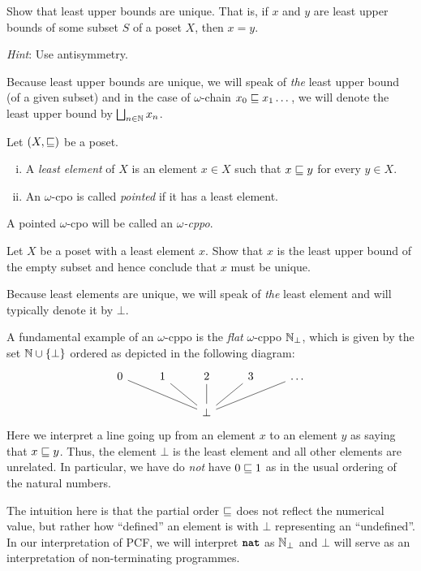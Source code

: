 \begin{exercise}\label{exer:least-upper-bounds-are-unique}
  Show that least upper bounds are unique. That is, if \(x\) and \(y\) are least
  upper bounds of some subset \(S\) of a poset \(X\), then \(x = y\).

  \emph{Hint}: Use antisymmetry.
\end{exercise}

Because least upper bounds are unique, we will speak of \emph{the} least upper
bound (of a given subset) and in the case of \(\omega\)-chain
\(x_0 \sqsubseteq x_1 \dots\), we will denote the least upper bound by
\(\bigsqcup_{n \in \mathbb N}x_n\).

\begin{definition}
  Let \((X,{\sqsubseteq})\) be a poset.
  \begin{enumerate}[(i)]
  \item A \emph{least element} of \(X\) is an element \(x \in X\) such that
    \(x \sqsubseteq y\) for every \(y \in X\).
  \item An \(\omega\)-cpo is called \emph{pointed} if it has a least element.
  \end{enumerate}
  A pointed \(\omega\)-cpo will be called an \emph{\(\omega\)-cppo}.
\end{definition}

\begin{exercise}\label{exer:least-element-is-unique}
  Let \(X\) be a poset with a least element \(x\). Show that \(x\) is the least
  upper bound of the empty subset and hence conclude that \(x\) must be unique.
\end{exercise}

Because least elements are unique, we will speak of \emph{the} least element and
will typically denote it by \(\bot\).

\begin{example}[\(\Nat_\bot\)]\label{N-bot}
  A fundamental example of an \(\omega\)-cppo is the \emph{flat} \(\omega\)-cppo
  \(\Nat_\bot\), which is given by the set \(\mathbb N \cup \{\bot\}\) ordered as
  depicted in the following diagram:
  \[
    \begin{tikzcd}
      0 & 1 & 2 & 3 & \ldots \\
      & & \bot \ar[ull,no head] \ar[ul,no head] \ar[u,no head] \ar[ur, no head]
      \ar[urr, no head]
    \end{tikzcd}
  \]
  Here we interpret a line going up from an element \(x\) to an element \(y\) as
  saying that \(x \sqsubseteq y\).
  Thus, the element \(\bot\) is the least element and all other elements are
  unrelated.
  In particular, we have do \emph{not} have \(0 \sqsubseteq 1\) as in the usual
  ordering of the natural numbers.

  The intuition here is that the partial order \({\sqsubseteq}\) does not reflect the
  numerical value, but rather how ``defined'' an element is with \(\bot\)
  representing an ``undefined''.
  In our interpretation of PCF, we will interpret \(\texttt{\textbf{nat}}\) as \(\Nat_\bot\)
  and \(\bot\) will serve as an interpretation of non-terminating programmes.
\end{example}


